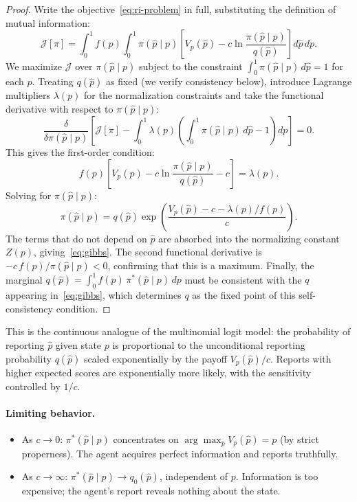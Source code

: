 \documentclass[11pt]{article}
\begin{document}
\begin{proof}
Write the objective~\eqref{eq:ri-problem} in full, substituting the definition of mutual information:
\[
\mathcal{J}[\pi] = \int_0^1 f(p) \int_0^1 \pi(\hat{p} \mid p) \left[ V_p(\hat{p}) - c \ln \frac{\pi(\hat{p} \mid p)}{q(\hat{p})} \right] d\hat{p}\, dp.
\]
We maximize $\mathcal{J}$ over $\pi(\hat{p} \mid p)$ subject to the constraint $\int_0^1 \pi(\hat{p} \mid p)\,d\hat{p} = 1$ for each $p$. Treating $q(\hat{p})$ as fixed (we verify consistency below), introduce Lagrange multipliers $\lambda(p)$ for the normalization constraints and take the functional derivative with respect to $\pi(\hat{p} \mid p)$:
\[
\frac{\delta}{\delta \pi(\hat{p} \mid p)} \left[ \mathcal{J}[\pi] - \int_0^1 \lambda(p) \left(\int_0^1 \pi(\hat{p} \mid p)\,d\hat{p} - 1\right) dp \right] = 0.
\]
This gives the first-order condition:
\[
f(p) \left[ V_p(\hat{p}) - c \ln \frac{\pi(\hat{p} \mid p)}{q(\hat{p})} - c \right] = \lambda(p).
\]
Solving for $\pi(\hat{p} \mid p)$:
\[
\pi(\hat{p} \mid p) = q(\hat{p}) \exp\!\left(\frac{V_p(\hat{p}) - c - \lambda(p)/f(p)}{c}\right).
\]
The terms that do not depend on $\hat{p}$ are absorbed into the normalizing constant $Z(p)$, giving~\eqref{eq:gibbs}. The second functional derivative is $-c\,f(p)/\pi(\hat{p} \mid p) < 0$, confirming that this is a maximum. Finally, the marginal $q(\hat{p}) = \int_0^1 f(p)\,\pi^*(\hat{p} \mid p)\,dp$ must be consistent with the $q$ appearing in~\eqref{eq:gibbs}, which determines $q$ as the fixed point of this self-consistency condition.
\end{proof}

This is the continuous analogue of the multinomial logit model: the probability of reporting $\hat{p}$ given state $p$ is proportional to the unconditional reporting probability $q(\hat{p})$ scaled exponentially by the payoff $V_p(\hat{p})/c$. Reports with higher expected scores are exponentially more likely, with the sensitivity controlled by $1/c$.

\paragraph{Limiting behavior.}
\begin{itemize}
\item As $c \to 0$: $\pi^*(\hat{p} \mid p)$ concentrates on $\arg\max_{\hat{p}} V_p(\hat{p}) = p$ (by strict properness). The agent acquires perfect information and reports truthfully.
\item As $c \to \infty$: $\pi^*(\hat{p} \mid p) \to q_0(\hat{p})$, independent of $p$. Information is too expensive; the agent's report reveals nothing about the state.
\end{itemize}
\end{document}
